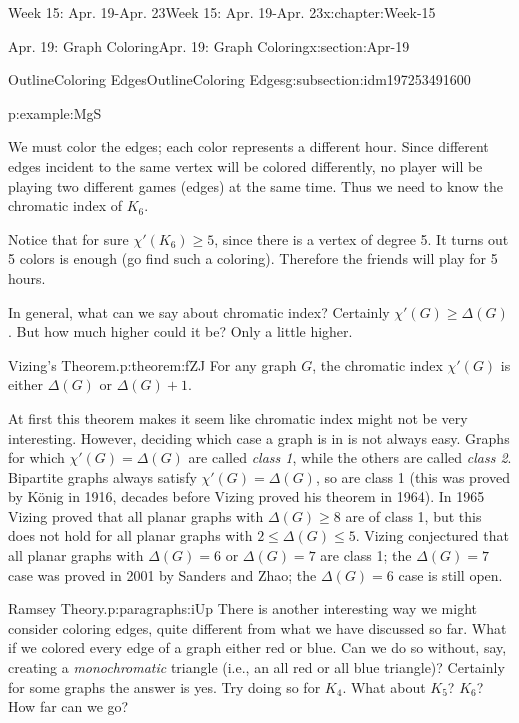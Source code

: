 \documentclass[oneside,10pt,]{book}
\numberwithin{equation}{section}
\renewcommand{\le}{\leqslant}
\renewcommand{\ge}{\geqslant}
\newcommand{\vtx}[2]{node[fill,circle,inner sep=0pt, minimum size=4pt,label=#1:#2]{}}
\renewcommand{\v}{\vtx{above}{}}
\begin{document}
\begin{chapterptx}{Week 15: Apr. 19-Apr. 23}{}{Week 15: Apr. 19-Apr. 23}{}{}{x:chapter:Week-15}
\begin{sectionptx}{Apr. 19: Graph Coloring}{}{Apr. 19: Graph Coloring}{}{}{x:section:Apr-19}
\begin{subsectionptx}{OutlineColoring Edges}{}{OutlineColoring Edges}{}{}{g:subsection:idm197253491600}
\begin{example}{}{p:example:MgS}
\begin{sidebyside}{1}{0.4}{0.4}{0}
\begin{sbspanel}{0.2}
{
}%
\end{sbspanel}%
\end{sidebyside}%
\par
We must color the edges; each color represents a different hour. Since different edges incident to the same vertex will be colored differently, no player will be playing two different games (edges) at the same time. Thus we need to know the chromatic index of \(K_6\).%
\par
Notice that for sure \(\chi'(K_6) \ge 5\), since there is a vertex of degree 5. It turns out 5 colors is enough (go find such a coloring). Therefore the friends will play for 5 hours.%
\end{example}
In general, what can we say about chromatic index? Certainly \(\chi'(G) \ge \Delta(G)\). But how much higher could it be? Only a little higher.%
\begin{theorem}{Vizing's Theorem.}{}{p:theorem:fZJ}%
%
For any graph \(G\), the chromatic index \(\chi'(G)\) is either \(\Delta(G)\) or \(\Delta(G) + 1\).%
\end{theorem}
At first this theorem makes it seem like chromatic index might not be very interesting. However, deciding which case a graph is in is not always easy. Graphs for which \(\chi'(G) = \Delta(G)\) are called \emph{class 1}, while the others are called \emph{class 2}. Bipartite graphs always satisfy \(\chi'(G) = \Delta(G)\), so are class 1 (this was proved by König in 1916, decades before Vizing proved his theorem in 1964). In 1965 Vizing proved that all planar graphs with \(\Delta(G) \ge 8\) are of class 1, but this does not hold for all planar graphs with \(2 \le \Delta(G) \le 5\). Vizing conjectured that all planar graphs with \(\Delta(G) = 6\) or \(\Delta(G) = 7\) are class 1; the \(\Delta(G) = 7\) case was proved in 2001 by Sanders and Zhao; the \(\Delta(G) = 6\) case is still open.%
\begin{paragraphs}{Ramsey Theory.}{p:paragraphs:iUp}%
%
There is another interesting way we might consider coloring edges, quite different from what we have discussed so far. What if we colored every edge of a graph either red or blue. Can we do so without, say, creating a \emph{monochromatic}  triangle (i.e., an all red or all blue triangle)? Certainly for some graphs the answer is yes. Try doing so for \(K_4\). What about \(K_5\)? \(K_6\)? How far can we go?%

\end{paragraphs}
\end{subsectionptx}
\end{sectionptx}
\end{chapterptx}
\end{document}
